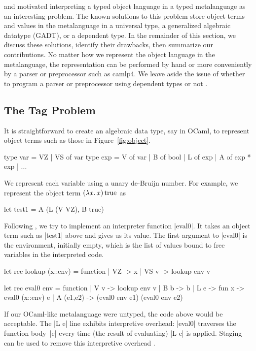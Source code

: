 \documentclass[preprint]{sigplanconf}
\newcommand{\oleg}[1]{{\it [Oleg says: #1]}}
\let\cite=\citep
\newcommand{\fun}[1]{\mathopen{\lambda\mathord{#1}.\,}}
\newcommand{\True}{\mathinner{\mathrm{true}}}
\begin{document}
 and \citet{xi-guarded} motivated interpreting
a typed object language in a typed metalanguage as an interesting
problem.  The known solutions to this problem store object terms and
values in the metalanguage in a universal type, a generalized algebraic
datatype (GADT), or a dependent type.  In the remainder of this section,
we discuss these solutions, identify their drawbacks, then summarize our
contributions.  No matter how we represent the object language in the
metalanguage, the representation can be performed by hand or more
conveniently by a parser or preprocessor such as camlp4.  We leave aside
the issue of whether to program a parser or preprocessor using dependent
types \citep{WalidICFP02} or not \citep{baars-typing}.

\subsection{The Tag Problem}\label{tagproblem}


It is straightforward to create an algebraic data type, say in OCaml, to
represent object terms such as those in Figure~\ref{fig:object}.
\begin{code}
type var = VZ | VS of var
type exp = V of var | B of bool
         | L of exp | A of exp * exp | ...
\end{code}
We represent each variable using a unary de-Bruijn number.
For example, we represent the object term $(\fun{x}x)\True$ as
\begin{code}
let test1 = A (L (V VZ), B true)
\end{code}

Following \citet{WalidICFP02},
we try to implement an interpreter function |eval0|. It takes
an object term such as |test1| above and gives us its value.
The first argument to |eval0| is the environment, initially empty,
which is the list of values bound to free variables in the
interpreted code.
\begin{code}
let rec lookup (x::env) = function
| VZ   -> x
| VS v -> lookup env v

let rec eval0 env = function 
| V v       -> lookup env v
| B b       -> b 
| L e       -> fun x -> eval0 (x::env) e
| A (e1,e2) -> (eval0 env e1) (eval0 env e2) 
\end{code}
If our OCaml-like metalanguage were untyped, the code above would be acceptable.
The |L e| line exhibits interpretive overhead:
|eval0| traverses the function body~|e| every time (the result of
evaluating) |L e| is applied. Staging can be used to remove this
interpretive overhead \cite[\S1.1--2]{WalidICFP02}.
\end{document}
